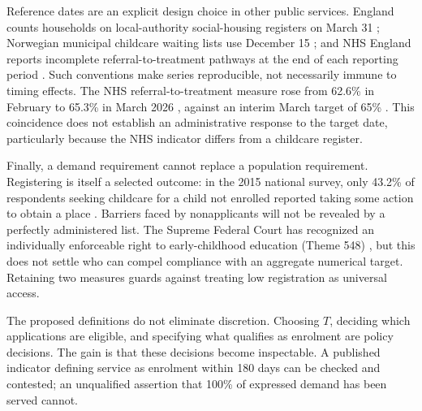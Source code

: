 Reference dates are an explicit design choice in other public services. England counts households on local-authority social-housing registers on March 31 \citep{mhclg_table600}; Norwegian municipal childcare waiting lists use December 15 \citep{ssb13632}; and NHS England reports incomplete referral-to-treatment pathways at the end of each reporting period \citep{nhs_rtt_mar26}. Such conventions make series reproducible, not necessarily immune to timing effects. The NHS referral-to-treatment measure rose from 62.6\% in February to 65.3\% in March 2026 \citep{nhs_rtt_mar26}, against an interim March target of 65\% \citep{nhs_annualreport2026}. This coincidence does not establish an administrative response to the target date, particularly because the NHS indicator differs from a childcare register.

Finally, a demand requirement cannot replace a population requirement. Registering is itself a selected outcome: in the 2015 national survey, only 43.2\% of respondents seeking childcare for a child not enrolled reported taking some action to obtain a place \citep{ibge2017cuidados}. Barriers faced by nonapplicants will not be revealed by a perfectly administered list. The Supreme Federal Court has recognized an individually enforceable right to early-childhood education (Theme 548) \citep{stf2022tema548}, but this does not settle who can compel compliance with an aggregate numerical target. Retaining two measures guards against treating low registration as universal access.

The proposed definitions do not eliminate discretion. Choosing $T$, deciding which applications are eligible, and specifying what qualifies as enrolment are policy decisions. The gain is that these decisions become inspectable. A published indicator defining service as enrolment within 180 days can be checked and contested; an unqualified assertion that 100\% of expressed demand has been served cannot.

